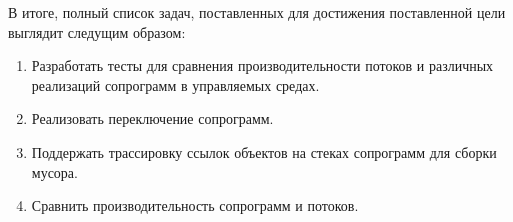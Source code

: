 	В итоге, полный список задач, поставленных для достижения поставленной цели выглядит следущим образом:
	\begin{enumerate}[align=left]
		\item Разработать тесты для сравнения производительности потоков и различных реализаций сопрограмм в управляемых средах. 
		\item Реализовать переключение сопрограмм.
		\item Поддержать трассировку ссылок объектов на стеках сопрограмм для сборки мусора. 
		\item Сравнить производительность сопрограмм и потоков.
	\end{enumerate}
	  
\clearpage